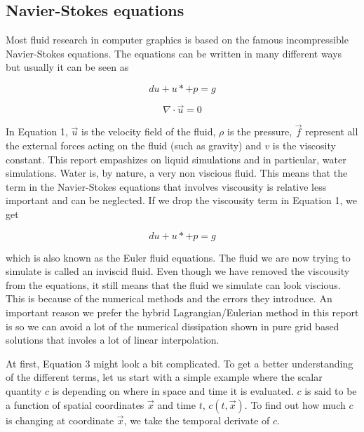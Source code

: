 \subsection{Navier-Stokes equations}

Most fluid research in computer graphics is based on the famous incompressible Navier-Stokes equations. The equations can be written in many different ways but usually it can be seen as

\begin{equation}
du + u* + p = g
\end{equation}

\begin{equation}
\nabla \cdot \vec{u} = 0
\end {equation}

In Equation 1, $\vec{u}$ is the velocity field of the fluid, $\rho$ is the pressure, $\vec{f}$ represent all the external forces acting on the fluid (such as gravity) and $v$ is the viscosity constant. This report empashizes on liquid simulations and in particular, water simulations. Water is, by nature, a very non viscious fluid. This means that the term in the Navier-Stokes equations that involves viscousity is relative less important and can be neglected. If we drop the viscousity term in Equation 1, we get

\begin{equation}
du + u* + p = g
\end{equation}

which is also known as the Euler fluid equations. The fluid we are now trying to simulate is called an inviscid fluid. Even though we have removed the viscousity from the equations, it still means that the fluid we simulate can look viscious. This is because of the numerical methods and the errors they introduce. An important reason we prefer the hybrid Lagrangian/Eulerian method in this report is so we can avoid a lot of the numerical dissipation shown in pure grid based solutions that involes a lot of linear interpolation. 
\newline

At first, Equation 3 might look a bit complicated. To get a better understanding of the different terms, let us start with a simple example where the scalar quantity $c$ is depending on where in space and time it is evaluated. $c$ is said to be a function of spatial coordinates $\vec{x}$ and time $t$, $c(t,\vec{x})$. To find out how much $c$ is changing at coordinate $\vec{x}$, we take the temporal derivate of $c$.

